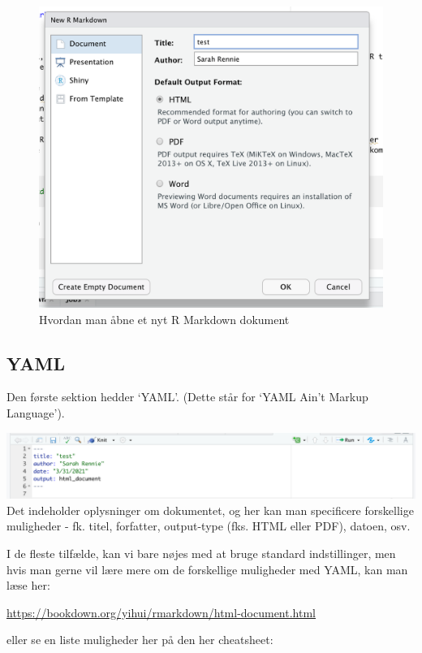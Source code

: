 \documentclass[
]{book}
\begin{document}
\begin{figure}
\centering
\includegraphics{plots/create_new_rmarkdown.png}
\caption{Hvordan man åbne et nyt R Markdown dokument}
\end{figure}

\hypertarget{yaml}{%
\subsection{YAML}\label{yaml}}

Den første sektion hedder `YAML'. (Dette står for `YAML Ain't Markup Language').

\includegraphics{plots/YAML.png}
Det indeholder oplysninger om dokumentet, og her kan man specificere forskellige muligheder - fk. titel, forfatter, output-type (fks. HTML eller PDF), datoen, osv.

I de fleste tilfælde, kan vi bare nøjes med at bruge standard indstillinger, men hvis man gerne vil lære mere om de forskellige muligheder med YAML, kan man læse her:

\url{https://bookdown.org/yihui/rmarkdown/html-document.html}

eller se en liste muligheder her på den her cheatsheet:
\end{document}
